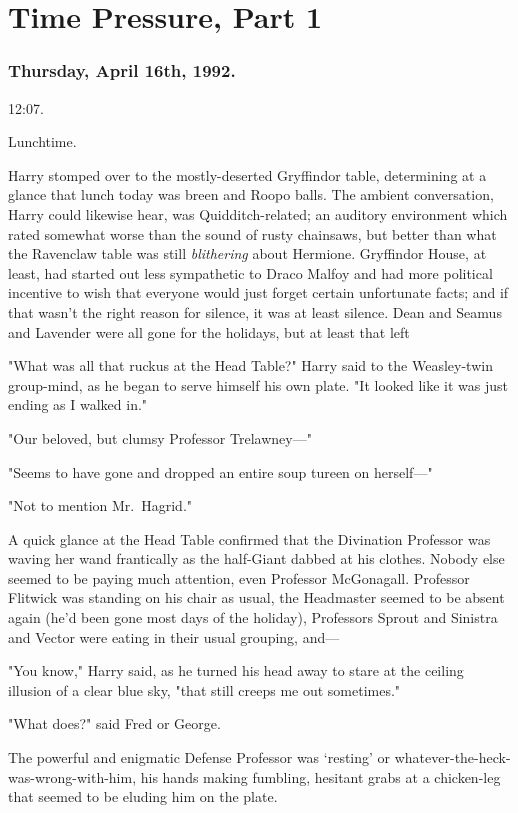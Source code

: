 \chapter{Time Pressure, Part 1}

\subsection{Thursday, April 16th, 1992.}

12:07\PM.

Lunchtime.

Harry stomped over to the mostly-deserted Gryffindor table, determining at a
glance that lunch today was breen and Roopo balls. The ambient conversation,
Harry could likewise hear, was Quidditch-related; an auditory environment which
rated somewhat worse than the sound of rusty chainsaws, but better than what
the Ravenclaw table was still \emph{blithering} about Hermione. Gryffindor
House, at least, had started out less sympathetic to Draco Malfoy and had more
political incentive to wish that everyone would just forget certain unfortunate
facts; and if that wasn't the right reason for silence, it was at least
silence. Dean and Seamus and Lavender were all gone for the holidays, but at
least that left{\el}

"What was all that ruckus at the Head Table?" Harry said to the Weasley-twin
group-mind, as he began to serve himself his own plate. "It looked like it was
just ending as I walked in."

"Our beloved, but clumsy Professor Trelawney—"

"Seems to have gone and dropped an entire soup tureen on herself—"

"Not to mention Mr.~Hagrid."

A quick glance at the Head Table confirmed that the Divination Professor was
waving her wand frantically as the half-Giant dabbed at his clothes. Nobody
else seemed to be paying much attention, even Professor McGonagall. Professor
Flitwick was standing on his chair as usual, the Headmaster seemed to be absent
again (he'd been gone most days of the holiday), Professors Sprout and Sinistra
and Vector were eating in their usual grouping, and—

"You know," Harry said, as he turned his head away to stare at the ceiling
illusion of a clear blue sky, "that still creeps me out sometimes."

"What does?" said Fred or George.

The powerful and enigmatic Defense Professor was `resting' or
whatever-the-heck-was-wrong-with-him, his hands making fumbling, hesitant grabs
at a chicken-leg that seemed to be eluding him on the plate.

